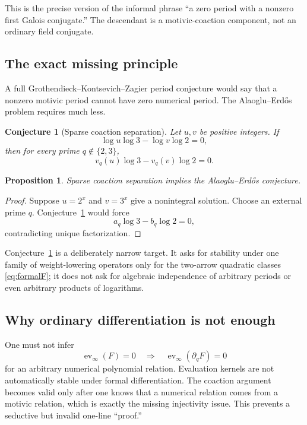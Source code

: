 \documentclass[11pt,oneside]{article}
\newtheorem{proposition}[theorem]{Proposition}
\newtheorem{conjecture}[theorem]{Conjecture}
\theoremstyle{definition}
\begin{document}
This is the precise version of the informal phrase ``a zero period with a nonzero first Galois conjugate.''  The descendant is a motivic-coaction component, not an ordinary field conjugate.

\subsection{The exact missing principle}

A full Grothendieck--Kontsevich--Zagier period conjecture would say that a nonzero motivic period cannot have zero numerical period.  The Alaoglu--Erd\H{o}s problem requires much less.

\begin{conjecture}[Sparse coaction separation]\label{conj:SCS}
Let $u,v$ be positive integers.  If
\[
  \log u\log3-\log v\log2=0,
\]
then for every prime $q\notin\{2,3\}$,
\[
  v_q(u)\log3-v_q(v)\log2=0.
\]
\end{conjecture}

\begin{proposition}
Sparse coaction separation implies the Alaoglu--Erd\H{o}s conjecture.
\end{proposition}

\begin{proof}
Suppose $u=2^x$ and $v=3^x$ give a nonintegral solution.  Choose an external prime $q$.  Conjecture~\ref{conj:SCS} would force
\[
  a_q\log3-b_q\log2=0,
\]
contradicting unique factorization.
\end{proof}

Conjecture~\ref{conj:SCS} is a deliberately narrow target.  It asks for stability under one family of weight-lowering operators only for the two-arrow quadratic classes \eqref{eq:formalF}; it does not ask for algebraic independence of arbitrary periods or even arbitrary products of logarithms.

\subsection{Why ordinary differentiation is not enough}

One must not infer
\[
 \operatorname{ev}_\infty(F)=0
 \quad\Longrightarrow\quad
 \operatorname{ev}_\infty(\partial_qF)=0
\]
for an arbitrary numerical polynomial relation.  Evaluation kernels are not automatically stable under formal differentiation.  The coaction argument becomes valid only after one knows that a numerical relation comes from a motivic relation, which is exactly the missing injectivity issue.  This prevents a seductive but invalid one-line ``proof.''
\end{document}

